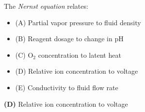

The {\it Nernst equation} relates:

\begin{itemize}
\item{(A)} Partial vapor pressure to fluid density
\vskip 5pt 
\item{(B)} Reagent dosage to change in pH
\vskip 5pt 
\item{(C)} O$_{2}$ concentration to latent heat
\vskip 5pt 
\item{(D)} Relative ion concentration to voltage
\vskip 5pt 
\item{(E)} Conductivity to fluid flow rate
\end{itemize}







{\bf (D)} Relative ion concentration to voltage 
 









